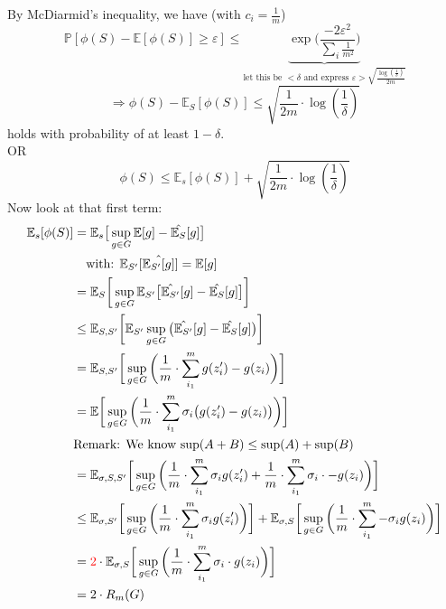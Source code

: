 \documentclass[10pt,a4paper]{article}
\theoremstyle{definition}
\theoremstyle{plain}
\begin{document}
	By McDiarmid's inequality, we have (with $c_i = \frac{1}{m}$)
	$$
		\mathbb{P}[\phi(S) - \mathbb{E}[\phi(S)] \geq \varepsilon] \leq \underbrace{\exp \bigg(\frac{-2\varepsilon^2}{\sum_{i} \frac{1}{m^2} }\bigg)}_{\text{let this be $<\delta$ and express $\varepsilon > \sqrt{ \frac{\log(\frac{1}{\delta})}{2m} }$}}
	$$
	$$
	\Rightarrow \phi(S) - \mathbb{E}_S[\phi(S)] \leq \sqrt{\frac{1}{2m} \cdot \log(\frac{1}{\delta})}
	$$
	holds with probability of at least $1-\delta$.\\
	OR\\
	$$
		\phi(S) \leq \mathbb{E}_s[\phi(S)] + \sqrt{\frac{1}{2m} \cdot \log(\frac{1}{\delta})}
	$$
	Now look at that first term:
\begin{align*}
		\mathbb{E}_s[\phi(S)] &= \mathbb{E}_s \big[\sup_{g \in G} \mathbb{E}[g] - \hat{\mathbb{E}_{S}}[g]\big]\\
		&\ \ \ \text{with: } \mathbb{E}_{S'}[\hat{\mathbb{E}_{S'} [g]}] = \mathbb{E}[g]\\
		&= \mathbb{E}_S \bigg[ \sup_{g \in G} \mathbb{E}_{S'} \big[  \hat{\mathbb{E}_{S'}} [g] - \hat{\mathbb{E}_{S}} [g] \big] \bigg]\\
		&\leq \mathbb{E}_{S,S'} \bigg[ \mathbb{E}_{S'} \sup_{g \in G}\big(  \hat{\mathbb{E}_{S'}} [g] - \hat{\mathbb{E}_{S}} [g]\big) \bigg]\\
		&= \mathbb{E}_{S,S'}\bigg[ \sup_{g \in G} \bigg( \frac{1}{m} \cdot \sum_{i_1}^{m} g(z_{i}') - g(z_i)\bigg) \bigg]\\
		&= \mathbb{E} \bigg[ \sup_{g \in G} \bigg( \frac{1}{m} \cdot \sum_{i_1}^{m} \sigma_i \big( g(z_{i}') - g(z_i) \big)  \bigg)  \bigg]\\
		& \text{Remark: We know $ \sup(A+B) \leq \sup(A) + \sup(B)$}\\
		&= \mathbb{E}_{\sigma, S, S'}\bigg[ \sup_{g \in G} \bigg( \frac{1}{m} \cdot \sum_{i_1}^{m} \sigma_i  g(z_{i}')  + \frac{1}{m} \cdot \sum_{i_1}^{m} \sigma_i \cdot -g(z_{i})  \bigg)  \bigg]\\
		&\leq \mathbb{E}_{\sigma, S'}\bigg[ \sup_{g \in G} \bigg( \frac{1}{m} \cdot \sum_{i_1}^{m} \sigma_i g(z_{i}') \bigg) \bigg] +
		\mathbb{E}_{\sigma, S}\bigg[ \sup_{g \in G} \bigg( \frac{1}{m} \cdot \sum_{i_1}^{m} -\sigma_i g(z_{i})  \bigg) \bigg]\\
		&= \textcolor{red}{2} \cdot \mathbb{E}_{\sigma, S}\bigg[ \sup_{g \in G} \bigg( \frac{1}{m} \cdot \sum_{i_1}^{m} \sigma_i \cdot g(z_{i})  \bigg) \bigg] \\
		&= 2 \cdot R_m(G)
\end{align*}
\end{document}
